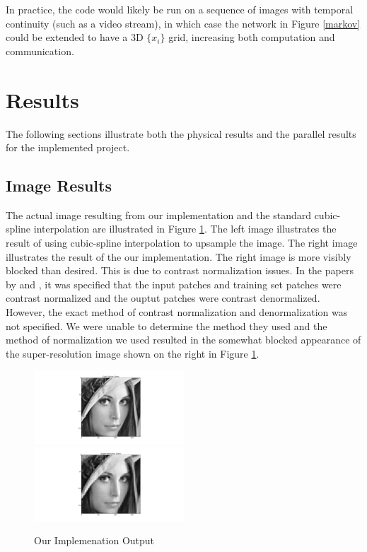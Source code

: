 \documentclass[a4paper]{article}
\begin{document}
In practice, the code would likely be run on a sequence of images with temporal continuity (such as a video stream), in which case the network in Figure \ref{markov} could be extended to have a 3D $\{x_i\}$ grid, increasing both computation and communication.

\section{Results}
The following sections illustrate both the physical results and the parallel results for the implemented project.
\subsection{Image Results}
The actual image resulting from our implementation and the standard cubic-spline interpolation are illustrated in Figure \ref{lenna}.  The left image illustrates the result of using cubic-spline interpolation to upsample the image.  The right image illustrates the result of the our implementation.  The right image is more visibly blocked than desired.  This is due to contrast normalization issues.  In the papers by \citet{fjp} and \citet{fp}, it was specified that the input patches and training set patches were contrast normalized and the ouptut patches were contrast denormalized.  However, the exact method of contrast normalization and denormalization was not specified.  We were unable to determine the method they used and the method of normalization we used resulted in the somewhat blocked appearance of the super-resolution image shown on the right in Figure \ref{lenna}. 

\begin{figure}[ht!]
\centerline{%
\includegraphics[width=0.5\textwidth]{figs/cubic-spline-zoom}%
\includegraphics[width=0.5\textwidth]{figs/super-res-zoom}%
}%
\caption{Our Implemenation Output}
\label{lenna}
\end{figure}
\end{document}
